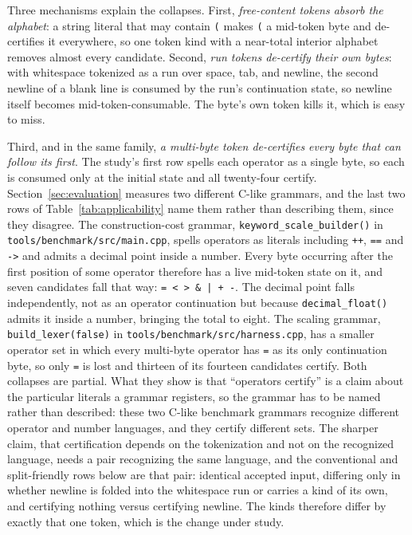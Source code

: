 \documentclass[11pt,a4paper]{article}
\theoremstyle{definition}
\theoremstyle{plain}
\newcommand{\code}[1]{\texttt{#1}}
\begin{document}
Three mechanisms explain the collapses. First, \emph{free-content tokens absorb the alphabet}: a string literal that
may contain \code{(} makes \code{(} a mid-token byte and de-certifies it everywhere, so one token kind with a
near-total interior alphabet removes almost every candidate. Second, \emph{run tokens de-certify their own bytes}:
with whitespace tokenized as a run over space, tab, and newline, the second newline of a blank line is consumed by the
run's continuation state, so newline itself becomes mid-token-consumable. The byte's own token kills it, which is easy
to miss.

Third, and in the same family, \emph{a multi-byte token de-certifies every byte that can follow its first}. The
study's first row spells each operator as a single byte, so each is consumed only at the initial state and all
twenty-four certify. Section~\ref{sec:evaluation} measures two different C-like grammars, and the last two rows of
Table~\ref{tab:applicability} name them rather than describing them, since they disagree. The construction-cost
grammar, \code{keyword\_scale\_builder()} in \code{tools/benchmark/src/main.cpp}, spells operators as literals
including \code{++}, \code{==} and \code{->} and admits a decimal point inside a number. Every byte occurring after
the first position of some operator therefore has a live mid-token state on it, and seven candidates fall that way:
\code{= < > \& | + -}. The decimal point falls independently, not as an operator continuation but because
\code{decimal\_float()} admits it inside a number, bringing the total to eight. The scaling grammar,
\code{build\_lexer(false)} in \code{tools/benchmark/src/harness.cpp}, has a smaller operator set in which every
multi-byte operator has \code{=} as its only continuation byte, so only \code{=} is lost and thirteen of its fourteen
candidates certify. Both collapses are partial. What they show is that ``operators certify'' is a claim about the
particular literals a grammar registers, so the grammar has to be named rather than described: these two C-like
benchmark grammars recognize different operator and number languages, and they certify different sets. The sharper
claim, that certification depends on the tokenization and not on the recognized language, needs a pair recognizing the
same language, and the conventional and split-friendly rows below are that pair: identical accepted input, differing
only in whether newline is folded into the whitespace run or carries a kind of its own, and certifying nothing versus
certifying newline. The kinds therefore differ by exactly that one token, which is the change under study.
\end{document}
